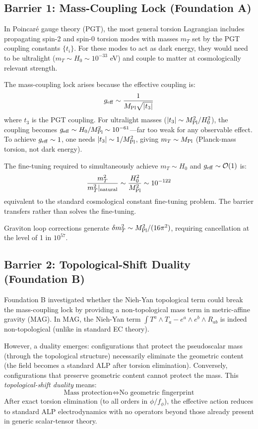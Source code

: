 \documentclass[a4paper,11pt]{article}
\newcommand{\Mpl}{M_{\rm Pl}}
\begin{document}
\subsection{Barrier 1: Mass-Coupling Lock (Foundation A)}

In Poincar\'e gauge theory (PGT), the most general torsion Lagrangian includes propagating spin-2 and spin-0 torsion modes with masses $m_T$ set by the PGT coupling constants $\{t_i\}$. For these modes to act as dark energy, they would need to be ultralight ($m_T \sim H_0 \sim 10^{-33}$ eV) and couple to matter at cosmologically relevant strength.

The mass-coupling lock arises because the effective coupling is:
\begin{equation}
g_{\rm eff} \sim \frac{1}{\Mpl \sqrt{|t_3|}}
\end{equation}
where $t_3$ is the PGT coupling. For ultralight masses ($|t_3| \sim \Mpl^2/H_0^2$), the coupling becomes $g_{\rm eff} \sim H_0/\Mpl^2 \sim 10^{-61}$---far too weak for any observable effect. To achieve $g_{\rm eff} \sim 1$, one needs $|t_3| \sim 1/\Mpl^2$, giving $m_T \sim \Mpl$ (Planck-mass torsion, not dark energy).

The fine-tuning required to simultaneously achieve $m_T \sim H_0$ and $g_{\rm eff} \sim \mathcal{O}(1)$ is:
\begin{equation}
\frac{m_T^2}{m_T^2|_{\rm natural}} \sim \frac{H_0^2}{\Mpl^2} \sim 10^{-122}
\end{equation}
equivalent to the standard cosmological constant fine-tuning problem. The barrier transfers rather than solves the fine-tuning.

Graviton loop corrections generate $\delta m_T^2 \sim \Mpl^2/(16\pi^2)$, requiring cancellation at the level of 1 in $10^{57}$.

\subsection{Barrier 2: Topological-Shift Duality (Foundation B)}

Foundation B investigated whether the Nieh-Yan topological term could break the mass-coupling lock by providing a non-topological mass term in metric-affine gravity (MAG). In MAG, the Nieh-Yan term $\int T^a \wedge T_a - e^a \wedge e^b \wedge R_{ab}$ is indeed non-topological (unlike in standard EC theory).

However, a duality emerges: configurations that protect the pseudoscalar mass (through the topological structure) necessarily eliminate the geometric content (the field becomes a standard ALP after torsion elimination). Conversely, configurations that preserve geometric content cannot protect the mass. This \emph{topological-shift duality} means:
\begin{equation}
\text{Mass protection} \iff \text{No geometric fingerprint}
\end{equation}
After exact torsion elimination (to all orders in $\phi/f_\phi$), the effective action reduces to standard ALP electrodynamics with no operators beyond those already present in generic scalar-tensor theory.
\end{document}
